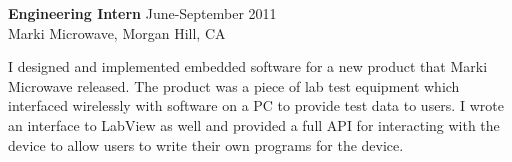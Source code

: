 \textbf{Engineering Intern} \hfill June-September 2011 \\
Marki Microwave, Morgan Hill, CA
\begin{description}  \itemsep -2pt %
\item I designed and implemented embedded software for a new product that
Marki Microwave released. The product was a piece of lab test equipment
which interfaced wirelessly with software on a PC to provide test data
to users. I wrote an interface to LabView as well and provided a full
API for interacting with the device to allow users to write their own
programs for the device.
\end{description}
